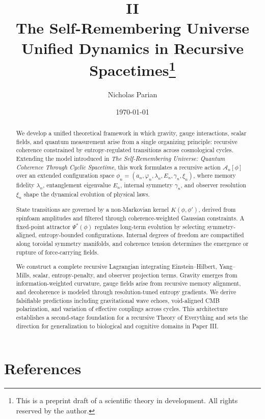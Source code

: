 \documentclass[11pt]{article}
\title{\textbf{II\\The Self-Remembering Universe\\Unified Dynamics in Recursive Spacetimes\footnote{This is a preprint draft of a scientific theory in development. All rights reserved by the author.}}}
\author[1]{Nicholas Parian}
\date{\today}
\begin{document}
\maketitle

\begin{abstract}
We develop a unified theoretical framework in which gravity, gauge interactions, scalar fields, and quantum measurement arise from a single organizing principle: recursive coherence constrained by entropy-regulated transitions across cosmological cycles. Extending the model introduced in \textit{The Self-Remembering Universe: Quantum Coherence Through Cyclic Spacetime}, this work formulates a recursive action $\mathcal{A}_n[\phi]$ over an extended configuration space $\phi_n = (a_n, \varphi_n, \lambda_n, E_n, \gamma_n, \xi_n)$, where memory fidelity $\lambda_n$, entanglement eigenvalue $E_n$, internal symmetry $\gamma_n$, and observer resolution $\xi_n$ shape the dynamical evolution of physical laws.

State transitions are governed by a non-Markovian kernel $K(\phi, \phi')$, derived from spinfoam amplitudes and filtered through coherence-weighted Gaussian constraints. A fixed-point attractor $\Psi^*(\phi)$ regulates long-term evolution by selecting symmetry-aligned, entropy-bounded configurations. Internal degrees of freedom are compactified along toroidal symmetry manifolds, and coherence tension determines the emergence or rupture of force-carrying fields.

We construct a complete recursive Lagrangian integrating Einstein–Hilbert, Yang–Mills, scalar, entropy-penalty, and observer projection terms. Gravity emerges from information-weighted curvature, gauge fields arise from recursive memory alignment, and decoherence is modeled through resolution-tuned entropy gradients. We derive falsifiable predictions including gravitational wave echoes, void-aligned CMB polarization, and variation of effective couplings across cycles. This architecture establishes a second-stage foundation for a recursive Theory of Everything and sets the direction for generalization to biological and cognitive domains in Paper III.
\end{abstract}



\tableofcontents

















\section*{References}


\end{document}
